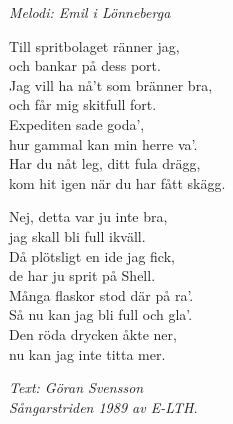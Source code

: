 {\footnotesize\textit{Melodi: Emil i Lönneberga}}\par
\vspace{10pt}
Till spritbolaget ränner jag,\\
och bankar på dess port.\\
Jag vill ha nå't som bränner bra,\\
och får mig skitfull fort.\\
Expediten sade goda',\\
hur gammal kan min herre va'.\\
Har du nåt leg, ditt fula drägg,\\
kom hit igen när du har fått skägg.\par
\vspace{10pt}
Nej, detta var ju inte bra,\\
jag skall bli full ikväll.\\
Då plötsligt en ide jag fick,\\
de har ju sprit på Shell.\\
Många flaskor stod där på ra'.\\
Så nu kan jag bli full och gla'.\\
Den röda drycken åkte ner,\\
nu kan jag inte titta mer.\par
\vspace{10pt}
{\footnotesize\textit{Text: Göran Svensson \\ Sångarstriden 1989 av
    E-LTH.}}

